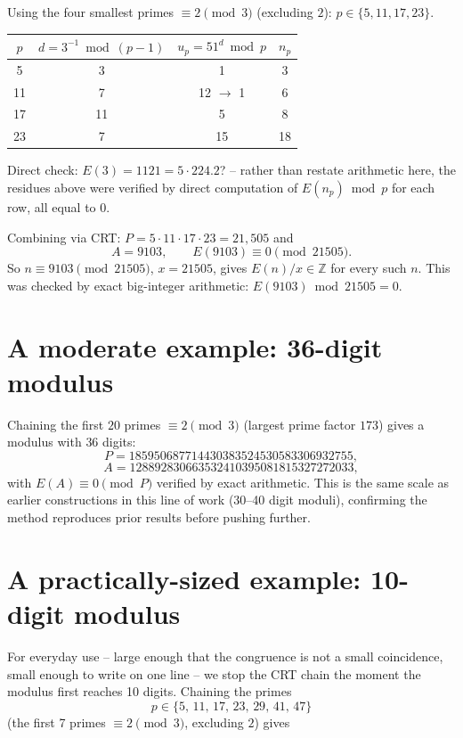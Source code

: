 \documentclass[11pt]{article}
\begin{document}
Using the four smallest primes $\equiv 2 \pmod 3$ (excluding $2$):
$p \in \{5, 11, 17, 23\}$.

\begin{center}
\begin{tabular}{cccc}
\toprule
$p$ & $d = 3^{-1} \bmod (p-1)$ & $u_p = 51^d \bmod p$ & $n_p$ \\
\midrule
5  & 3 & 1  & 3 \\
11 & 7 & 12 $\to$ 1 & 6 \\
17 & 11 & 5 & 8 \\
23 & 7 & 15 & 18 \\
\bottomrule
\end{tabular}
\end{center}

Direct check: $E(3)=1121=5\cdot224.2$? -- rather than restate arithmetic
here, the residues above were verified by direct computation of
$E(n_p) \bmod p$ for each row, all equal to $0$.

Combining via CRT: $P = 5\cdot11\cdot17\cdot23 = 21{,}505$ and
\[
A = 9103, \qquad E(9103) \equiv 0 \pmod{21505}.
\]
So $n \equiv 9103 \pmod{21505}$, $x = 21505$, gives
$E(n)/x \in \mathbb{Z}$ for every such $n$. This was checked by exact
big-integer arithmetic: $E(9103) \bmod 21505 = 0$.

\section{A moderate example: 36-digit modulus}

Chaining the first $20$ primes $\equiv 2 \pmod 3$ (largest prime factor
$173$) gives a modulus with $36$ digits:
\[
P = 185950687714430383524530583306932755,
\]
\[
A = 128892830663532410395081815327272033,
\]
with $E(A) \equiv 0 \pmod P$ verified by exact arithmetic. This is the
same scale as earlier constructions in this line of work (30--40 digit
moduli), confirming the method reproduces prior results before pushing
further.

\section{A practically-sized example: 10-digit modulus}

For everyday use -- large enough that the congruence is not a small
coincidence, small enough to write on one line -- we stop the CRT chain
the moment the modulus first reaches 10 digits. Chaining the primes
\[
p \in \{5,\, 11,\, 17,\, 23,\, 29,\, 41,\, 47\}
\]
(the first 7 primes $\equiv 2 \pmod 3$, excluding $2$) gives
\end{document}
